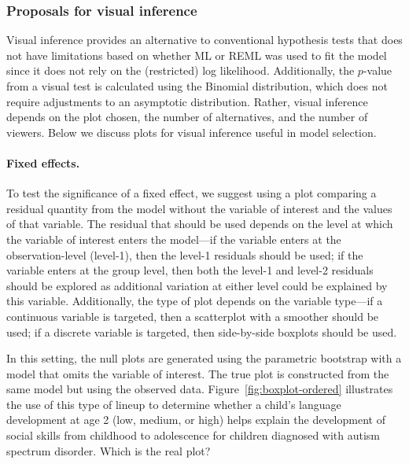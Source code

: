 \documentclass{article} %
\begin{document}
\subsubsection{Proposals for visual inference}

Visual inference provides an alternative to conventional hypothesis tests that does not have limitations based on whether ML or REML was used to fit the model since it does not rely on the (restricted) log likelihood. Additionally, the $p$-value from a visual test is calculated using the Binomial distribution, which does not require adjustments to an asymptotic distribution. Rather, visual inference depends on the plot chosen, the number of alternatives, and the number of viewers. Below we discuss plots for visual inference useful in model selection.

\paragraph{Fixed effects.} To test the significance of a fixed effect, we suggest using a plot comparing a residual quantity from the model without the variable of interest and the values of that variable. The residual that should be used depends on the level at which the variable of interest enters the model---if the variable enters at the observation-level (level-1), then the level-1 residuals should be used; if the variable enters at the group level, then both the level-1 and level-2 residuals should be explored as additional variation at either level could be explained by this variable. Additionally, the type of plot depends on the variable type---if a continuous variable is targeted, then a scatterplot with a smoother should be used; if a discrete variable is targeted, then side-by-side boxplots should be used. 

In this setting, the null plots are generated using the parametric bootstrap with a model that omits the variable of interest. The true plot is constructed from the same model but using the observed data. Figure~\ref{fig:boxplot-ordered} illustrates the use of this type of lineup to determine whether a child's language development at age 2 (low, medium, or high) helps explain the development of social skills from childhood to adolescence for children diagnosed with autism spectrum disorder. Which is the real plot? 

\end{document}
